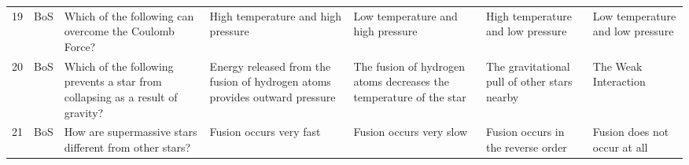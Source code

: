 \documentclass[10pt]{article}
\begin{document}
\begin{tiny}
\begin{longtable}{r P{0.3in} P{1.203in} P{0.8in} P{0.8in} P{0.8in} P{0.8in}}
    19    &     BoS &                                                                                                                                                                                                                           Which of the following can overcome the Coulomb Force? &                                                                                                    High temperature and high pressure &                                                                     Low temperature and high pressure &                                                                                          High temperature and low pressure &                                                                                                  Low temperature and low pressure \\
    20    &     BoS &                                                                                                                                                                                                   Which of the following prevents a star from collapsing as a result of gravity? &                                                           Energy released from the fusion of hydrogen atoms provides outward pressure &                                    The fusion of hydrogen atoms decreases the temperature of the star &                                                                               The gravitational pull of other stars nearby &                                                                                                              The Weak Interaction \\
    21    &     BoS &                                                                                                                                                                                                                           How are supermassive stars different from other stars? &                                                                                                               Fusion occurs very fast &                                                                               Fusion occurs very slow &                                                                                         Fusion occurs in the reverse order &                                                                                                      Fusion does not occur at all \\

\end{longtable}
\end{tiny}
\end{document}
